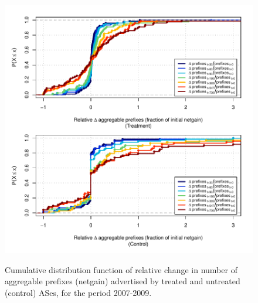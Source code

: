 \clearpage
\vspace*{16pt}
\begin{figure}[H]
\begin{centering}
\begin{singlespace}
\captionsetup{list=no}
    \includegraphics[width=6in]{figures/behavior-rel_netgain-2007_2009-corr.pdf}
    \vspace{-2em}\\
    \caption{Cumulative distribution function of relative change in number of
    aggregable prefixes (netgain) advertised by treated and untreated (control)
    ASes, for the period 2007-2009.}
\end{singlespace}
\end{centering}
\end{figure}


